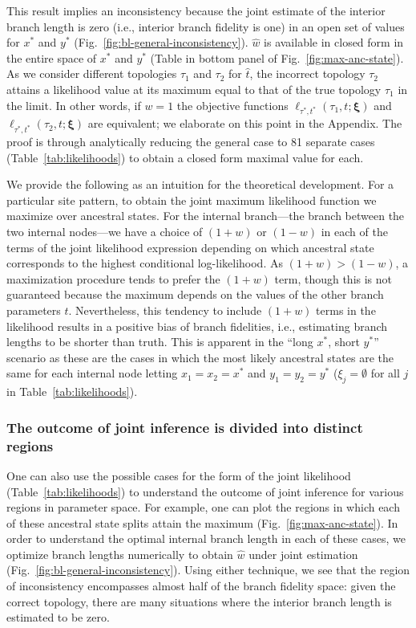 \documentclass[11pt]{article}
\begin{document}
This result implies an inconsistency because the joint estimate of the interior branch length is zero (i.e., interior branch fidelity is one) in an open set of values for $x^*$ and $y^*$ (Fig.~\ref{fig:bl-general-inconsistency}).
$\hat{w}$ is available in closed form in the entire space of $x^*$ and $y^*$ (Table in bottom panel of Fig.~\ref{fig:max-anc-state}).
As we consider different topologies $\tau_1$ and $\tau_2$ for $\hat{t}$, the incorrect topology $\tau_2$ attains a likelihood value at its maximum equal to that of the true topology $\tau_1$ in the limit.
In other words, if $w=1$ the objective functions $\ell_{\tau^*,t^*}(\tau_1, t; \boldsymbol\xi)$ and $\ell_{\tau^*,t^*}(\tau_2, t; \boldsymbol\xi)$ are equivalent; we elaborate on this point in the Appendix.
The proof is through analytically reducing the general case to 81 separate cases (Table~\ref{tab:likelihoods}) to obtain a closed form maximal value for each.

We provide the following as an intuition for the theoretical development.
For a particular site pattern, to obtain the joint maximum likelihood function we maximize over ancestral states.
For the internal branch---the branch between the two internal nodes---we have a choice of $(1+w)$ or $(1-w)$ in each of the terms of the joint likelihood expression depending on which ancestral state corresponds to the highest conditional log-likelihood.
As $(1+w) > (1-w)$, a maximization procedure tends to prefer the $(1+w)$ term, though this is not guaranteed because the maximum depends on the values of the other branch parameters $t$.
Nevertheless, this tendency to include $(1+w)$ terms in the likelihood results in a positive bias of branch fidelities, i.e., estimating branch lengths to be shorter than truth.
This is apparent in the ``long $x^*$, short $y^*$'' scenario as these are the cases in which the most likely ancestral states are the same for each internal node letting $x_1=x_2=x^*$ and $y_1=y_2=y^*$ ($\xi_j=\emptyset$ for all $j$ in Table~\ref{tab:likelihoods}).

\subsubsection*{The outcome of joint inference is divided into distinct regions}

One can also use the possible cases for the form of the joint likelihood (Table~\ref{tab:likelihoods}) to understand the outcome of joint inference for various regions in parameter space.
For example, one can plot the regions in which each of these ancestral state splits attain the maximum (Fig.~\ref{fig:max-anc-state}).
In order to understand the optimal internal branch length in each of these cases, we optimize branch lengths numerically to obtain $\hat{w}$ under joint estimation (Fig.~\ref{fig:bl-general-inconsistency}).
Using either technique, we see that the region of inconsistency encompasses almost half of the branch fidelity space: given the correct topology, there are many situations where the interior branch length is estimated to be zero.
\end{document}
